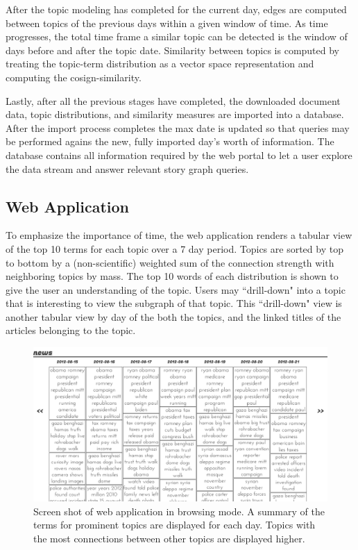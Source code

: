 \documentclass[10pt]{article}
\begin{document}
After the topic modeling has completed for the current day, edges are computed between topics of the previous days within a given window of time.  As time progresses, the total time frame a similar topic can be detected is the window of days before and after the topic date.  Similarity between topics is computed by treating the topic-term distribution as a vector space representation and computing the cosign-similarity.  

Lastly, after all the previous stages have completed, the downloaded document data, topic distributions, and similarity measures are imported into a database.  After the import process completes the max date is updated so that queries may be performed agains the new, fully imported day's worth of information.  The database contains all information required by the web portal to let a user explore the data stream and answer relevant story graph queries.

\subsection {Web Application}
To emphasize the importance of time, the web application renders a tabular view of the top 10 terms for each topic over a 7 day period.  Topics are sorted by top to bottom by a (non-scientific) weighted sum of the connection strength with neighboring topics by mass.  The top 10 words of each distribution is shown to give the user an understanding of the topic.  Users may ``drill-down" into a topic that is interesting to view the subgraph of that topic.  This ``drill-down" view is another tabular view by day of the both the topics, and the linked titles of the articles belonging to the topic.

\begin{figure}
\centering
\includegraphics[scale=0.3]{img/story-all.png}
\caption{Screen shot of web application in browsing mode.  A summary of the terms for prominent topics are displayed for each day.  Topics with the most connections between other topics are displayed higher.}
\end{figure}
\end{document}
